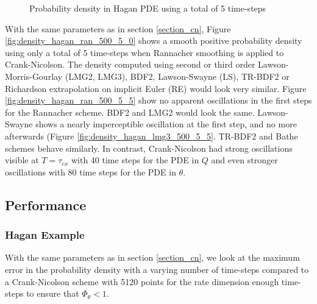\documentclass[]{rAMF2e}
\begin{document}
\begin{figure}[htb]
\begin{center}
  \end{center}
     \caption{\label{fig:density_hagan_lmg2_500_10} Probability density in Hagan PDE using a total of 5 time-steps}
\end{figure}
With the same parameters as in section \ref{section_cn}, Figure \ref{fig:density_hagan_ran_500_5_0} shows a smooth positive probability density using only a total of 5 time-steps when Rannacher smoothing is applied to Crank-Nicolson. The density computed using second or third order Lawson-Morris-Gourlay (LMG2, LMG3), BDF2, Lawson-Swayne (LS), TR-BDF2 or Richardson extrapolation on implicit Euler (RE) would look very similar. Figure \ref{fig:density_hagan_ran_500_5_5} show no apparent oscillations in the first steps for the Rannacher scheme. BDF2 and LMG2 would look the same.  Lawson-Swayne shows a nearly imperceptible oscillation at the first step, and no more afterwards (Figure \ref{fig:density_hagan_lmg3_500_5_5}. TR-BDF2 and Bathe schemes behave similarly.
In contrast, Crank-Nicolson had strong oscillations visible at $T=\tau_{ex}$ with 40 time steps for the PDE in $Q$ and even stronger oscillations with 80 time steps for the PDE in $\theta$.

\subsection{Performance}
\subsubsection{Hagan Example}
With the same parameters as in section \ref{section_cn}, we look at the maximum error in the probability density with a varying number of time-steps compared to a Crank-Nicolson scheme with 5120 points for the rate dimension enough time-steps to ensure that $\Phi_{\theta} < 1$. 
\end{document}
